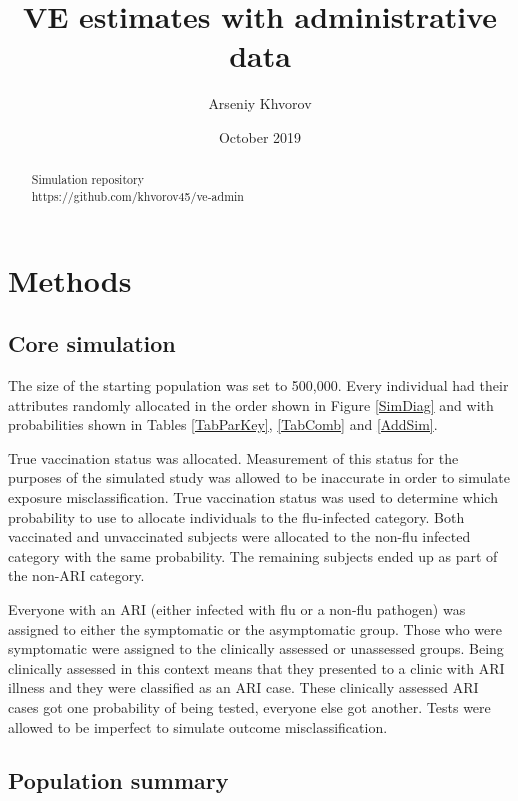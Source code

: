 \documentclass[11pt]{article}
\title{VE estimates with administrative data}
\author{Arseniy Khvorov}
\date{October 2019}
\begin{document}
\maketitle

\renewcommand{\abstractname}{}
\begin{abstract}
	\begin{center}
	Simulation repository\\
	https://github.com/khvorov45/ve-admin
	\end{center}
\end{abstract}

\tableofcontents

\pagebreak

%
\section{Methods}

\subsection{Core simulation}

The size of the starting population was set to 500,000. Every individual had their attributes randomly allocated in the order shown in Figure \ref{SimDiag} and with probabilities shown in Tables \ref{TabParKey}, \ref{TabComb} and \ref{AddSim}.

True vaccination status was allocated. Measurement of this status for the purposes of the simulated study was allowed to be inaccurate in order to simulate exposure misclassification. True vaccination status was used to determine which probability to use to allocate individuals to the flu-infected category. Both vaccinated and unvaccinated subjects were allocated to the non-flu infected category with the same probability. The remaining subjects ended up as part of the non-ARI category.

Everyone with an ARI (either infected with flu or a non-flu pathogen) was assigned to either the symptomatic or the asymptomatic group. Those who were symptomatic were assigned to the clinically assessed or unassessed groups. Being clinically assessed in this context means that they presented to a clinic with ARI illness and they were classified as an ARI case. These clinically assessed ARI cases got one probability of being tested, everyone else got another. Tests were allowed to be imperfect to simulate outcome misclassification.

\subsection{Population summary}
\end{document}
